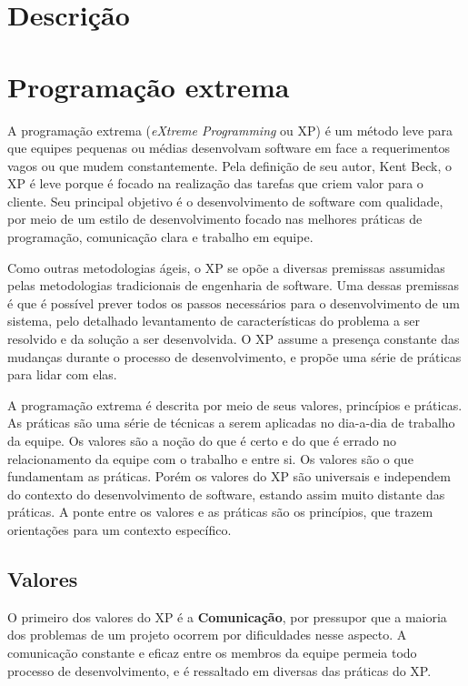 \documentclass[a4paper,12pt,font=plain,header=plain]{abnt}
\begin{document}
  \section{Descrição}

  \section{Programação extrema}
    A programação extrema (\textit{eXtreme Programming} ou XP) é um método leve para que equipes pequenas ou médias desenvolvam software em face a requerimentos vagos ou que mudem constantemente\cite{beck04}. Pela definição de seu autor, Kent Beck, o XP é leve porque é focado na realização das tarefas que criem valor para o cliente. Seu principal objetivo é o desenvolvimento de software com qualidade, por meio de um estilo de desenvolvimento focado nas melhores práticas de programação, comunicação clara e trabalho em equipe.

    Como outras metodologias ágeis, o XP se opõe a diversas premissas assumidas pelas metodologias tradicionais de engenharia de software. Uma dessas premissas é que é possível prever todos os passos necessários para o desenvolvimento de um sistema, pelo detalhado levantamento de características do problema a ser resolvido e da solução a ser desenvolvida. O XP assume a presença constante das mudanças durante o processo de desenvolvimento, e propõe uma série de práticas para lidar com elas.

    A programação extrema é descrita por meio de seus valores, princípios e práticas. As práticas são uma série de técnicas a serem aplicadas no dia-a-dia de trabalho da equipe. Os valores são a noção do que é certo e do que é errado no relacionamento da equipe com o trabalho e entre si. Os valores são o que fundamentam as práticas. Porém os valores do XP são universais e independem do contexto do desenvolvimento de software, estando assim muito distante das práticas. A ponte entre os valores e as práticas são os princípios, que trazem orientações para um contexto específico.

    \subsection{Valores}

      O primeiro dos valores do XP é a \textbf{Comunicação}, por pressupor que a maioria dos problemas de um projeto ocorrem por dificuldades nesse aspecto. A comunicação constante e eficaz entre os membros da equipe permeia todo processo de desenvolvimento, e é ressaltado em diversas das práticas do XP.
\end{document}
